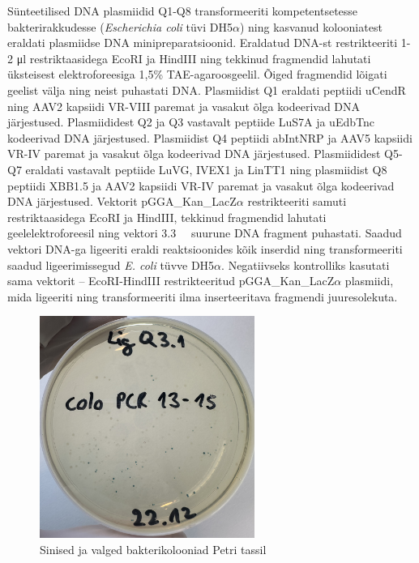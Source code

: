\documentclass{trkut}%
\begin{document}
Sünteetilised DNA plasmiidid Q1-Q8 transformeeriti kompetentsetesse
bakterirakkudesse (\textit{Escherichia coli} tüvi DH5$\alpha$) ning kasvanud kolooniatest eraldati plasmiidse DNA minipreparatsioonid. Eraldatud DNA-st restrikteeriti 1-2 \si{\micro\litre} restriktaasidega EcoRI ja HindIII ning tekkinud fragmendid lahutati üksteisest elektroforeesiga 1,5\% TAE-agaroosgeelil. Õiged fragmendid lõigati geelist välja ning neist puhastati DNA. Plasmiidist Q1 eraldati peptiidi uCendR ning AAV2 kapsiidi VR-VIII paremat ja vasakut
õlga kodeerivad DNA järjestused. Plasmiididest Q2 ja Q3 vastavalt peptiide LuS7A ja uEdbTnc kodeerivad DNA järjestused. Plasmiidist Q4 peptiidi abIntNRP ja AAV5 kapsiidi VR-IV paremat ja vasakut õlga kodeerivad DNA järjestused. Plasmiididest Q5-Q7 eraldati
vastavalt peptiide LuVG, IVEX1 ja LinTT1 ning plasmiidist Q8 peptiidi XBB1.5 ja AAV2 kapsiidi VR-IV paremat ja vasakut õlga kodeerivad DNA järjestused. Vektorit pGGA\_Kan\_LacZ$\alpha$ restrikteeriti samuti restriktaasidega EcoRI ja HindIII, tekkinud fragmendid lahutati geelelektroforeesil ning vektori \SI{3,3}{\kilo\base} suurune DNA fragment puhastati. Saadud vektori DNA-ga ligeeriti eraldi reaktsioonides kõik inserdid ning transformeeriti saadud ligeerimissegud \textit{E. coli} tüvve DH5$\alpha$. Negatiivseks kontrolliks kasutati sama vektorit – EcoRI-HindIII restrikteeritud pGGA\_Kan\_LacZ$\alpha$ plasmiidi, mida ligeeriti ning transformeeriti ilma inserteeritava fragmendi juuresolekuta.

\begin{figure}[htbp]
	\includegraphics[width=7cm]{sinivalge.jpg}
	\caption{Sinised ja valged bakterikolooniad Petri tassil}
	\label{sinivalge}
\end{figure}
\end{document}
